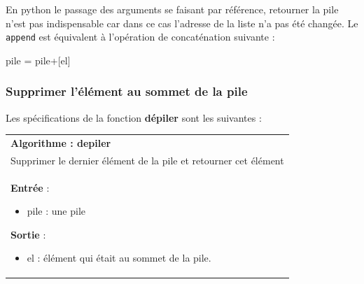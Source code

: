 \documentclass[10pt,fleqn]{article} %
\begin{document}
\begin{rem}
En python le passage des arguments se faisant par référence, retourner la pile n'est pas indispensable car dans ce cas l'adresse de la liste n'a pas été changée.
Le \texttt{append} est équivalent à l'opération de concaténation suivante :
\begin{python}
pile = pile+[el]
\end{python}
\end{rem}

\subsubsection{Supprimer l'élément au sommet de la pile}
Les spécifications de la fonction \textbf{dépiler} sont les suivantes :

\begin{tabular}{p{\linewidth}}
\hline
\textbf{Algorithme : depiler} \\
Supprimer le dernier élément de la pile et retourner cet élément\\
\hline
\textbf{Entrée} : 
\begin{itemize}
\item pile : une pile
\end{itemize}
\textbf{Sortie} : 
\begin{itemize}
\item el : élément qui était au sommet de la pile.
\end{itemize} \\
\hline 
\end{tabular}

\vspace{.5cm}
\end{document}
